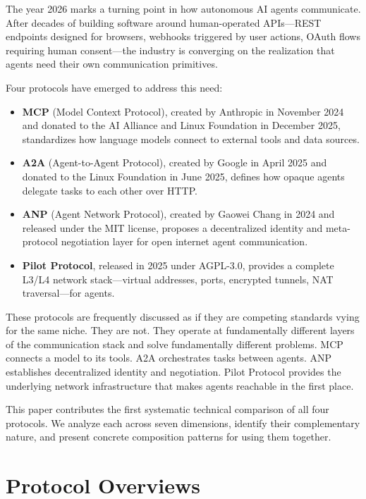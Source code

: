\documentclass[11pt,a4paper]{article}
\begin{document}
The year 2026 marks a turning point in how autonomous AI agents communicate. After decades of building software around human-operated APIs---REST endpoints designed for browsers, webhooks triggered by user actions, OAuth flows requiring human consent---the industry is converging on the realization that agents need their own communication primitives.

Four protocols have emerged to address this need:

\begin{itemize}
    \item \textbf{MCP} (Model Context Protocol), created by Anthropic in November 2024 and donated to the AI Alliance and Linux Foundation in December 2025, standardizes how language models connect to external tools and data sources.
    \item \textbf{A2A} (Agent-to-Agent Protocol), created by Google in April 2025 and donated to the Linux Foundation in June 2025, defines how opaque agents delegate tasks to each other over HTTP.
    \item \textbf{ANP} (Agent Network Protocol), created by Gaowei Chang in 2024 and released under the MIT license, proposes a decentralized identity and meta-protocol negotiation layer for open internet agent communication.
    \item \textbf{Pilot Protocol}, released in 2025 under AGPL-3.0, provides a complete L3/L4 network stack---virtual addresses, ports, encrypted tunnels, NAT traversal---for agents.
\end{itemize}

These protocols are frequently discussed as if they are competing standards vying for the same niche. They are not. They operate at fundamentally different layers of the communication stack and solve fundamentally different problems. MCP connects a model to its tools. A2A orchestrates tasks between agents. ANP establishes decentralized identity and negotiation. Pilot Protocol provides the underlying network infrastructure that makes agents reachable in the first place.

This paper contributes the first systematic technical comparison of all four protocols. We analyze each across seven dimensions, identify their complementary nature, and present concrete composition patterns for using them together.

\section{Protocol Overviews}
\end{document}
